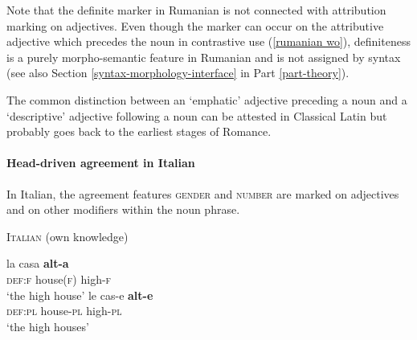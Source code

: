 Note that the definite marker in Rumanian is not connected with attribution marking on adjectives. Even though the marker can occur on the attributive adjective which precedes the noun in contrastive use (\ref{rumanian wo}), definiteness is a purely morpho-semantic feature in Rumanian and is not assigned by syntax (see also Section \ref{syntax-morphology-interface} in Part \ref{part-theory}).

The common distinction between an ‘emphatic’ adjective preceding a noun and a ‘descriptive’ adjective following a noun can be attested in Classical Latin \cite[146]{posner1996} but probably goes back to the earliest stages of Romance.

\paragraph{Head-driven agreement in Italian} 
In Italian, the agreement features \textsc{gender} and \textsc{number} are marked on adjectives and on other modifiers within the noun phrase.
\begin{exe}
\ex \textsc{Italian} (own knowledge)
\begin{xlist}
\ex
\gll	la casa \textbf{alt-a}\\
	\textsc{def:f} house(\textsc{f}) high-\textsc{f}\\
\glt	‘the high house’
\ex
\gll	le cas-e \textbf{alt-e}\\
	\textsc{def:pl} house-\textsc{pl} high-\textsc{pl}\\
\glt	‘the high houses’
\end{xlist}
\end{exe}

